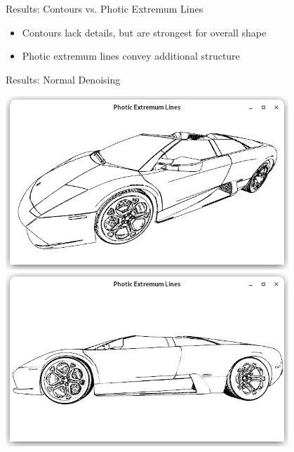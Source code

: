 \documentclass[aspectratio=169]{beamer}
\begin{document}
\begin{frame}{Results: Contours vs. Photic Extremum Lines}
\begin{figure}
    \end{figure}
    \bigskip
    \pause
    \begin{itemize}
      \item<+-> Contours lack details, but are strongest for overall shape
      \item<+-> Photic extremum lines convey additional structure
    \end{itemize}
  \end{frame}

  \begin{frame}{Results: Normal Denoising}
    \begin{minipage}[c]{0.49\textwidth}
      \center
      \includegraphics[width=0.8\textwidth,trim={15px 15 15 50},clip]{images/lamborghini-front.png}\\
      \includegraphics[width=0.8\textwidth,trim={15px 15 15 50},clip]{images/lamborghini-side.png}
    \end{minipage}
    \begin{minipage}[c]{0.49\textwidth}
      \center

\end{minipage}
\end{frame}
\end{document}
